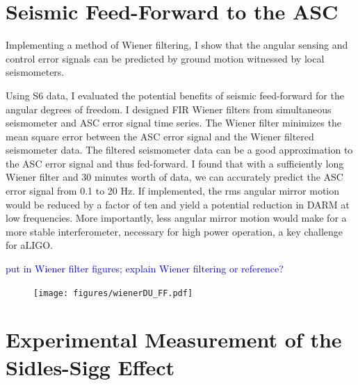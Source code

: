 \section{Seismic Feed-Forward to the ASC}
Implementing a method of Wiener ﬁltering, I show that the angular
sensing and control error signals can be predicted by ground motion
witnessed by local seismometers.

Using S6 data, I evaluated the potential benefits of seismic
feed-forward for the angular degrees of freedom. I designed FIR Wiener
filters from simultaneous seismometer and ASC error signal time
series. The Wiener filter minimizes the mean square error between the
ASC error signal and the Wiener filtered seismometer data. The
filtered seismometer data can be a good approximation to the ASC error
signal and thus fed-forward. I found that with a sufficiently long
Wiener filter and 30 minutes worth of data, we can accurately predict
the ASC error signal from 0.1 to 20 Hz. If implemented, the rms
angular mirror motion would be reduced by a factor of ten and yield a
potential reduction in DARM at low frequencies. More importantly, less
angular mirror motion would make for a more stable interferometer,
necessary for high power operation, a key challenge for aLIGO.

\textcolor{blue}{put in Wiener filter figures; explain Wiener
  filtering or reference?}


\begin{figure}
\begin{centering}
\texttt{[image: figures/wienerDU\_FF.pdf]}
\caption[]{}
\label{fig:wienerFF}
\end{centering}
\end{figure}






\section{Experimental Measurement of the Sidles-Sigg Effect}

